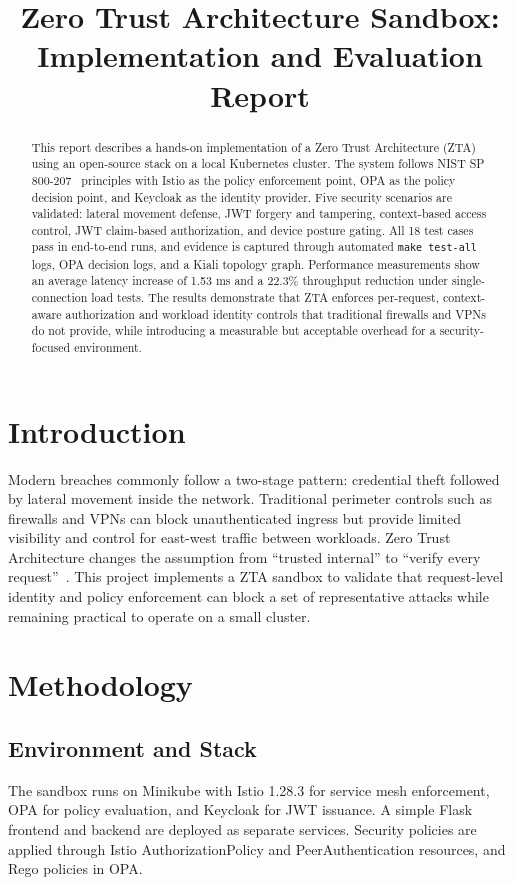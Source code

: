 \documentclass[conference]{IEEEtran}
\title{Zero Trust Architecture Sandbox: Implementation and Evaluation Report}
\author{\IEEEauthorblockN{Minsoo Ahn}
\IEEEauthorblockA{CSE 487 T92\\
Student ID: 114743792\\
Instructor: Antonino Mione\\
May 11, 2026}}
\begin{document}
\maketitle

\begin{abstract}
This report describes a hands-on implementation of a Zero Trust Architecture (ZTA)
using an open-source stack on a local Kubernetes cluster. The system follows NIST SP
800-207~\cite{nist} principles with Istio as the policy enforcement point, OPA as the policy
decision point, and Keycloak as the identity provider. Five security scenarios are
validated: lateral movement defense, JWT forgery and tampering, context-based access
control, JWT claim-based authorization, and device posture gating. All 18 test cases pass in
end-to-end runs, and evidence is captured through automated \texttt{make test-all} logs, OPA decision
logs, and a Kiali topology graph. Performance measurements show an average latency increase of 1.53 ms and a 22.3\%
throughput reduction under single-connection load tests. The results demonstrate that
ZTA enforces per-request, context-aware authorization and workload identity controls
that traditional firewalls and VPNs do not provide, while introducing a measurable but
acceptable overhead for a security-focused environment.
\end{abstract}

\section{Introduction}
Modern breaches commonly follow a two-stage pattern: credential theft followed by
lateral movement inside the network. Traditional perimeter controls such as firewalls
and VPNs can block unauthenticated ingress but provide limited visibility and control
for east-west traffic between workloads. Zero Trust Architecture changes the assumption
from ``trusted internal'' to ``verify every request''~\cite{nist,beyondcorp}. This project implements a ZTA
sandbox to validate that request-level identity and policy enforcement can block a set
of representative attacks while remaining practical to operate on a small cluster.

\vspace{4pt}
\section{Methodology}
\subsection{Environment and Stack}
The sandbox runs on Minikube with Istio 1.28.3 for service mesh enforcement, OPA for
policy evaluation, and Keycloak for JWT issuance. A simple Flask frontend and backend
are deployed as separate services. Security policies are applied through Istio
AuthorizationPolicy and PeerAuthentication resources, and Rego policies in OPA.
\end{document}
